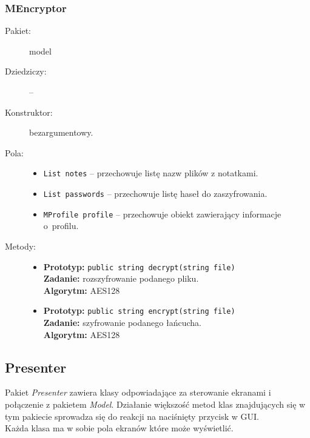 \documentclass[a4paper]{article}
\newcommand{\prog}{\texttt}
\begin{document}
\subsubsection{MEncryptor}
\begin{description}
    \item[Pakiet:] model
    \item[Dziedziczy:] --
    \item[Konstruktor:] bezargumentowy.
    \item[Pola:] \hfill
    \begin{itemize}
        \item \prog{List notes} -- przechowuje listę nazw plików z notatkami.
        \item \prog{List passwords} -- przechowuje listę haseł do zaszyfrowania.
        \item \prog{MProfile profile} -- przechowuje obiekt zawierający informacje o~profilu.
    \end{itemize}
    \item[Metody:] \hfill
    \begin{itemize}
        \item \textbf{Prototyp:} \prog{public string decrypt(string file)}\\\textbf{Zadanie:} rozszyfrowanie podanego pliku.\\\textbf{Algorytm:} AES128
        \item \textbf{Prototyp:} \prog{public string encrypt(string file)}\\\textbf{Zadanie:} szyfrowanie podanego łańcucha.\\\textbf{Algorytm:} AES128
    \end{itemize}
\end{description}

\subsection{Presenter}
Pakiet \textit{Presenter} zawiera klasy odpowiadające za sterowanie ekranami i połączenie z pakietem \textit{Model}. Działanie większość metod klas znajdujących się w tym pakiecie sprowadza się do reakcji na naciśnięty przycisk w GUI.\\
Każda klasa ma w sobie pola ekranów które może wyświetlić.
\end{document}
